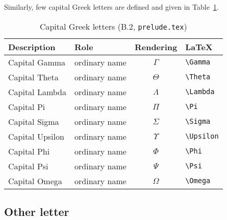 \documentclass{article}
\newcommand{\emfile}[1]{\texttt{#1}}%
\newcommand{\preludefile}{\emfile{prelude.tex}}
\newcommand{\smallcaption}[1]{{\small (#1)}}
\begin{document}
%
Similarly, few capital Greek letters are defined and given in Table~\ref{tbl:letters-greek-capital}.
%
\begin{table}[ht]
\centering
\begin{tabular}{|l|l|c|l|}
   \hline
   \textbf{Description} & \textbf{Role} & \textbf{Rendering} & \textbf{\LaTeX} \\
   \hline
   Capital Gamma    & ordinary name & $\Gamma$   & \verb|\Gamma| \\
   \hline
   Capital Theta    & ordinary name & $\Theta$   & \verb|\Theta| \\
   \hline
   Capital Lambda   & ordinary name & $\Lambda$  & \verb|\Lambda| \\
   \hline
   Capital Pi       & ordinary name & $\Pi$      & \verb|\Pi| \\
   \hline
   Capital Sigma    & ordinary name & $\Sigma$   & \verb|\Sigma| \\
   \hline
   Capital Upsilon  & ordinary name & $\Upsilon$ & \verb|\Upsilon| \\
   \hline
   Capital Phi      & ordinary name & $\Phi$     & \verb|\Phi| \\
   \hline
   Capital Psi      & ordinary name & $\Psi$     & \verb|\Psi| \\
   \hline
   Capital Omega    & ordinary name & $\Omega$   & \verb|\Omega| \\
   \hline
\end{tabular}
\caption{Capital Greek letters \smallcaption{B.2, \preludefile}}\label{tbl:letters-greek-capital}
\end{table}

\subsection{Other letter}\label{sec:letters-other}
\end{document}
